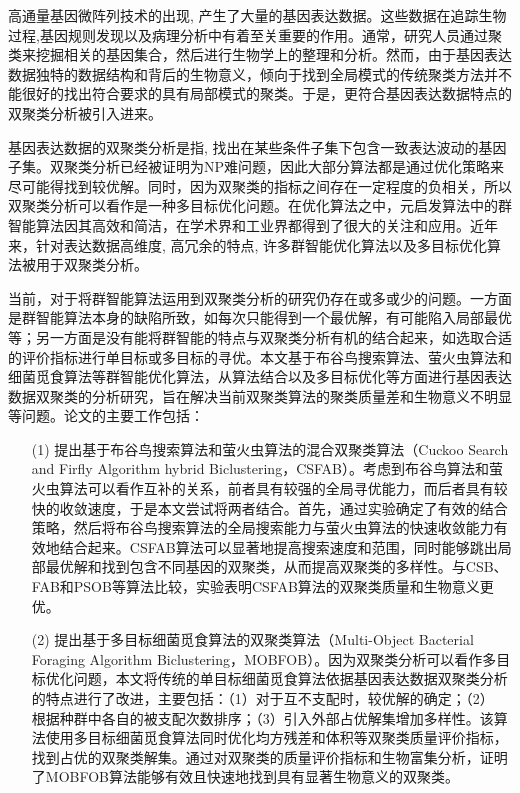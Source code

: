 \begin{cabstract}
  高通量基因微阵列技术的出现, 产生了大量的基因表达数据。这些数据在追踪生物过程,基因规则发现以及病理分析中有着至关重要的作用。通常，研究人员通过聚类来挖掘相关的基因集合，然后进行生物学上的整理和分析。然而，由于基因表达数据独特的数据结构和背后的生物意义，倾向于找到全局模式的传统聚类方法并不能很好的找出符合要求的具有局部模式的聚类。于是，更符合基因表达数据特点的双聚类分析被引入进来。
  
  基因表达数据的双聚类分析是指, 找出在某些条件子集下包含一致表达波动的基因子集。双聚类分析已经被证明为NP难问题，因此大部分算法都是通过优化策略来尽可能得找到较优解。同时，因为双聚类的指标之间存在一定程度的负相关，所以双聚类分析可以看作是一种多目标优化问题。在优化算法之中，元启发算法中的群智能算法因其高效和简洁，在学术界和工业界都得到了很大的关注和应用。近年来，针对表达数据高维度, 高冗余的特点, 许多群智能优化算法以及多目标优化算法被用于双聚类分析。

  当前，对于将群智能算法运用到双聚类分析的研究仍存在或多或少的问题。一方面是群智能算法本身的缺陷所致，如每次只能得到一个最优解，有可能陷入局部最优等；另一方面是没有能将群智能的特点与双聚类分析有机的结合起来，如选取合适的评价指标进行单目标或多目标的寻优。本文基于布谷鸟搜索算法、萤火虫算法和细菌觅食算法等群智能优化算法，从算法结合以及多目标优化等方面进行基因表达数据双聚类的分析研究，旨在解决当前双聚类算法的聚类质量差和生物意义不明显等问题。论文的主要工作包括：

  \begin{itemize}
    \item[(1)] 提出基于布谷鸟搜索算法和萤火虫算法的混合双聚类算法（Cuckoo Search and Firfly Algorithm hybrid Biclustering，CSFAB）。考虑到布谷鸟算法和萤火虫算法可以看作互补的关系，前者具有较强的全局寻优能力，而后者具有较快的收敛速度，于是本文尝试将两者结合。首先，通过实验确定了有效的结合策略，然后将布谷鸟搜索算法的全局搜索能力与萤火虫算法的快速收敛能力有效地结合起来。CSFAB算法可以显著地提高搜索速度和范围，同时能够跳出局部最优解和找到包含不同基因的双聚类，从而提高双聚类的多样性。与CSB、FAB和PSOB等算法比较，实验表明CSFAB算法的双聚类质量和生物意义更优。

    \item[(2)] 提出基于多目标细菌觅食算法的双聚类算法（Multi-Object Bacterial Foraging Algorithm Biclustering，MOBFOB）。因为双聚类分析可以看作多目标优化问题，本文将传统的单目标细菌觅食算法依据基因表达数据双聚类分析的特点进行了改进，主要包括：（1）对于互不支配时，较优解的确定；（2） 根据种群中各自的被支配次数排序；（3）引入外部占优解集增加多样性。该算法使用多目标细菌觅食算法同时优化均方残差和体积等双聚类质量评价指标，找到占优的双聚类解集。通过对双聚类的质量评价指标和生物富集分析，证明了MOBFOB算法能够有效且快速地找到具有显著生物意义的双聚类。
  \end{itemize}


\end{cabstract}

